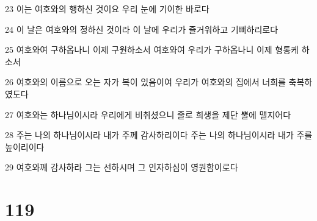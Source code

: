 \par 23 이는 여호와의 행하신 것이요 우리 눈에 기이한 바로다
\par 24 이 날은 여호와의 정하신 것이라 이 날에 우리가 즐거워하고 기뻐하리로다
\par 25 여호와여 구하옵나니 이제 구원하소서 여호와여 우리가 구하옵나니 이제 형통케 하소서
\par 26 여호와의 이름으로 오는 자가 복이 있음이여 우리가 여호와의 집에서 너희를 축복하였도다
\par 27 여호와는 하나님이시라 우리에게 비취셨으니 줄로 희생을 제단 뿔에 맬지어다
\par 28 주는 나의 하나님이시라 내가 주께 감사하리이다 주는 나의 하나님이시라 내가 주를 높이리이다
\par 29 여호와께 감사하라 그는 선하시며 그 인자하심이 영원함이로다

\chapter{119}

